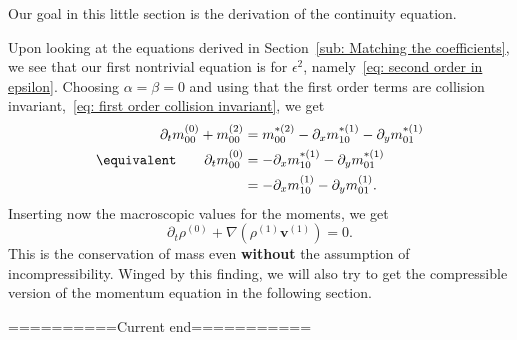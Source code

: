 Our goal in this little section is the derivation of the continuity equation.

Upon looking at the equations derived in Section~\ref{sub: Matching the coefficients}, we see that our first nontrivial equation is for $\epsilon^2$, namely~\eqref{eq: second order in epsilon}.
Choosing $\alpha=\beta=0$ and using that the first order terms are collision invariant,~\eqref{eq: first order collision invariant}, we get
\begin{equation}
    \begin{aligned}
      \partial_t m_{00}^{(0)} + m_{00}^{(2)} & =  m_{00}^{*(2)} - \partial_x m_{10}^{*(1)} - \partial_y m_{01}^{*(1)} \\
      \equivalent \qquad \partial_t m_{00}^{(0)} & =  - \partial_x m_{10}^{*(1)} - \partial_y m_{01}^{*(1)} \\
      & =  - \partial_x m_{10}^{(1)} - \partial_y m_{01}^{(1)}.
    \end{aligned}
\end{equation}
Inserting now the macroscopic values for the moments, we get
\begin{equation}
  \partial_t \rho^{(0)} + \nabla (\rho^{(1)} \mathbf{v}^{(1)}) = 0.
\end{equation}
This is the conservation of mass even \textbf{without} the assumption of incompressibility.
Winged by this finding, we will also try to get the compressible version of the momentum equation in the following section.


==========Current end===========
